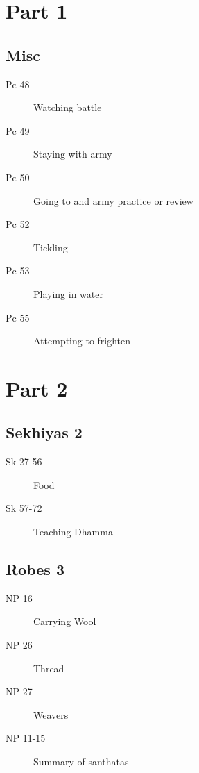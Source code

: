 \documentclass[11pt,oneside]{memoir}
\begin{document}
\begin{multicols}{2}

\section{Part 1}

\subsection{Misc}

\begin{description}
\item[Pc 48] Watching battle
\item[Pc 49] Staying with army
\item[Pc 50] Going to and army practice or review
\item[Pc 52] Tickling
\item[Pc 53] Playing in water
\item[Pc 55] Attempting to frighten
\end{description}

\columnbreak

\section{Part 2}

\subsection{Sekhiyas 2}

\begin{description}
\item[Sk 27-56] Food
\item[Sk 57-72] Teaching Dhamma
\end{description}

\subsection{Robes 3}

\begin{description}
\item[NP 16] Carrying Wool
\item[NP 26] Thread
\item[NP 27] Weavers
\item[NP 11-15] Summary of santhatas
\end{description}

\end{multicols}
\end{document}
